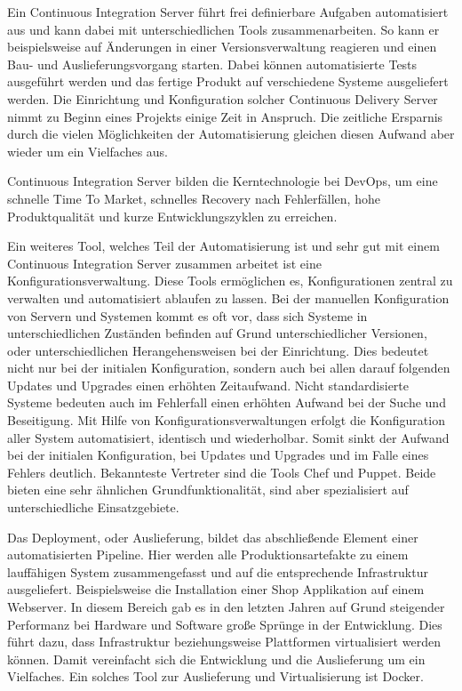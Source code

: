 Ein Continuous Integration Server führt frei definierbare Aufgaben automatisiert aus und kann dabei mit unterschiedlichen Tools zusammenarbeiten. 
So kann er beispielsweise auf Änderungen in einer Versionsverwaltung reagieren und einen Bau- und Auslieferungsvorgang starten. 
Dabei können automatisierte Tests ausgeführt werden und das fertige Produkt auf verschiedene Systeme ausgeliefert werden. 
Die Einrichtung und Konfiguration solcher Continuous Delivery Server nimmt zu Beginn eines Projekts einige Zeit in Anspruch. 
Die zeitliche Ersparnis durch die vielen Möglichkeiten der Automatisierung gleichen diesen Aufwand aber wieder um ein Vielfaches aus. 
\parencite[Vgl.][S. 79 - 134]{smart:2011}

Continuous Integration Server bilden die Kerntechnologie bei DevOps, um eine schnelle Time To Market, schnelles Recovery nach Fehlerfällen, hohe Produktqualität und kurze Entwicklungszyklen zu erreichen.

Ein weiteres Tool, welches Teil der Automatisierung ist und sehr gut mit einem Continuous Integration Server zusammen arbeitet ist eine Konfigurationsverwaltung. 
Diese Tools ermöglichen es, Konfigurationen zentral zu verwalten und automatisiert ablaufen zu lassen. 
Bei der manuellen Konfiguration von Servern und Systemen kommt es oft vor, dass sich Systeme in unterschiedlichen Zuständen befinden auf Grund unterschiedlicher Versionen, oder unterschiedlichen Herangehensweisen bei der Einrichtung. 
Dies bedeutet nicht nur bei der initialen Konfiguration, sondern auch bei allen darauf folgenden Updates und Upgrades einen erhöhten Zeitaufwand. 
Nicht standardisierte Systeme bedeuten auch im Fehlerfall einen erhöhten Aufwand bei der Suche und Beseitigung. 
Mit Hilfe von Konfigurationsverwaltungen erfolgt die Konfiguration aller System automatisiert, identisch und wiederholbar. 
Somit sinkt der Aufwand bei der initialen Konfiguration, bei Updates und Upgrades und im Falle eines Fehlers deutlich. 
Bekannteste Vertreter sind die Tools Chef und Puppet. 
Beide bieten eine sehr ähnlichen Grundfunktionalität, sind aber spezialisiert auf unterschiedliche Einsatzgebiete. 
\parencite[Vgl.][S. 1 - 32, S. 1 - 8]{krum:2014, taylor:2014}

Das Deployment, oder Auslieferung, bildet das abschließende Element einer automatisierten Pipeline. 
Hier werden alle Produktionsartefakte zu einem lauffähigen System zusammengefasst und auf die entsprechende Infrastruktur ausgeliefert.
Beispielsweise die Installation einer Shop Applikation auf einem Webserver. 
In diesem Bereich gab es in den letzten Jahren auf Grund steigender Performanz bei Hardware und Software große Sprünge in der Entwicklung. 
Dies führt dazu, dass Infrastruktur beziehungsweise Plattformen virtualisiert werden können. 
Damit vereinfacht sich die Entwicklung und die Auslieferung um ein Vielfaches. Ein solches Tool zur Auslieferung und Virtualisierung ist Docker.

